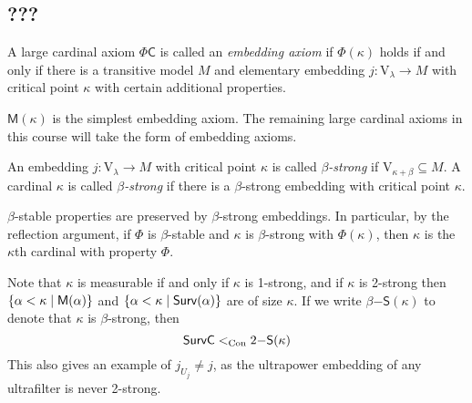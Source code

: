 \subsection{???}
\begin{definition}
    A large cardinal axiom \( \Phi\mathsf{C} \) is called an \emph{embedding axiom} if \( \Phi(\kappa) \) holds if and only if there is a transitive model \( M \) and elementary embedding \( j : \mathrm{V}_\lambda \to M \) with critical point \( \kappa \) with certain additional properties.
\end{definition}
\( \mathsf{M}(\kappa) \) is the simplest embedding axiom.
The remaining large cardinal axioms in this course will take the form of embedding axioms.
\begin{definition}
    An embedding \( j : \mathrm{V}_\lambda \to M \) with critical point \( \kappa \) is called \emph{\( \beta \)-strong} if \( \mathrm{V}_{\kappa + \beta} \subseteq M \).
    A cardinal \( \kappa \) is called \emph{\( \beta \)-strong} if there is a \( \beta \)-strong embedding with critical point \( \kappa \).
\end{definition}
\( \beta \)-stable properties are preserved by \( \beta \)-strong embeddings.
In particular, by the reflection argument, if \( \Phi \) is \( \beta \)-stable and \( \kappa \) is \( \beta \)-strong with \( \Phi(\kappa) \), then \( \kappa \) is the \( \kappa \)th cardinal with property \( \Phi \).

Note that \( \kappa \) is measurable if and only if \( \kappa \) is 1-strong, and if \( \kappa \) is 2-strong then \( \qty{\alpha < \kappa \mid \mathsf{M}(\alpha)} \) and \( \qty{\alpha < \kappa \mid \mathsf{Surv}(\alpha)} \) are of size \( \kappa \).
If we write \( \beta\mathsf{-S}(\kappa) \) to denote that \( \kappa \) is \( \beta \)-strong, then
\[ \mathsf{SurvC} <_{\operatorname{Con}} 2\mathsf{-S}(\kappa) \]
This also gives an example of \( j_{U_j} \neq j \), as the ultrapower embedding of any ultrafilter is never 2-strong.
